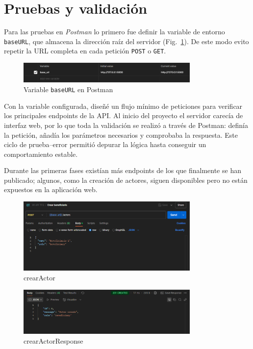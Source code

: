 \section{Pruebas y validación}
\label{subsubsec:PruebasValidacion}
Para las pruebas en \emph{Postman} lo primero fue definir la variable de entorno
\texttt{baseURL}, que almacena la dirección raíz del servidor
(Fig.~\ref{fig:baseURL}).  
De este modo evito repetir la URL completa en cada petición \texttt{POST} o
\texttt{GET}.

\begin{figure}[H]
  \centering
  \includegraphics[width=0.8\textwidth]{Imagenes/baseURL.png}
  \caption{Variable \texttt{baseURL} en Postman}
  \label{fig:baseURL}
\end{figure}
Con la variable configurada, diseñé un flujo mínimo de peticiones para
verificar los principales endpoints de la API.  
Al inicio del proyecto el servidor carecía de interfaz web, por lo que toda la
validación se realizó a través de Postman: definía la petición, añadía los
parámetros necesarios y comprobaba la respuesta.  
Este ciclo de prueba–error permitió depurar la lógica hasta conseguir un
comportamiento estable.

Durante las primeras fases existían más endpoints de los que finalmente se han
publicado; algunos, como la creación de actores, siguen disponibles pero no
están expuestos en la aplicación web.

\begin{figure}[H]
  \centering
  \includegraphics[width=0.8\textwidth]{Imagenes/crearActor.png}
  \caption{crearActor}
  \label{fig:crearActor}
\end{figure}

\begin{figure}[H]
  \centering
  \includegraphics[width=0.8\textwidth]{Imagenes/crearActorResponse.png}
  \caption{crearActorResponse}
  \label{fig:crearActorResponse}
\end{figure}

